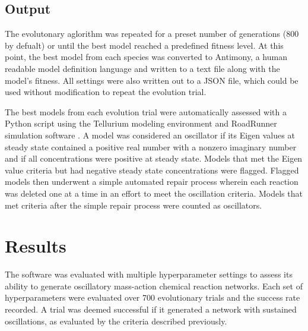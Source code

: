 \documentclass[12pt]{report}
\begin{document}
\subsection{Output}
The evolutonary aglorithm was repeated for a preset number of generations (800 by defualt) or until the best model reached a predefined fitness level. At this point, the best model from each species was converted to Antimony, a human readable model definition language \cite{Smith2009} and written to a text file along with the model's fitness. All settings were also written out to a JSON file, which could be used without modification to repeat the evolution trial.

The best models from each evolution trial were automatically assessed with a Python script using the Tellurium modeling environment \cite{Choi2018} and RoadRunner simulation software \cite{andy2020}. A model was considered an oscillator if its Eigen values at steady state contained a positive real number with a nonzero imaginary number and if all concentrations were positive at steady state. Models that met the Eigen value criteria but had negative steady state concentrations were flagged. Flagged models then underwent a simple automated repair process wherein each reaction was deleted one at a time in an effort to meet the oscillation criteria. Models that met criteria after the simple repair process were counted as oscillators.

\section{Results}
The software was evaluated with multiple hyperparameter settings to assess its ability to generate oscillatory mass-action chemical reaction networks. Each set of hyperparameters were evaluated over 700 evolutionary trials and the success rate recorded. A trial was deemed successful if it generated a network with sustained oscillations, as evaluated by the criteria described previously.
\end{document}
